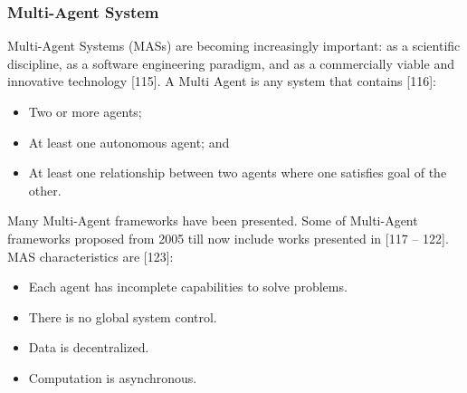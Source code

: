 \documentclass[12pt,a4paper,final,twoside,onecolumn,titlepage]{book}
\begin{document}
\subsubsection{Multi-Agent System}
Multi-Agent Systems (MASs) are becoming increasingly important: as a scientific discipline, as a software engineering paradigm, and as a commercially viable and innovative technology [115].
A Multi Agent is any system that contains [116]:
\begin{itemize}
\item Two or more agents;
\item At least one autonomous agent; and
\item At least one relationship between two agents where one satisfies goal of the other.
\end{itemize}
Many Multi-Agent frameworks have been presented. Some of Multi-Agent frameworks proposed from 2005 till now include works presented in [117 – 122].
\gls{MAS} characteristics are [123]:
\begin{itemize}
\item Each agent has incomplete capabilities to solve problems.
\item There is no global system control.
\item Data is decentralized.
\item Computation is asynchronous.
\end{itemize}
\end{document}
